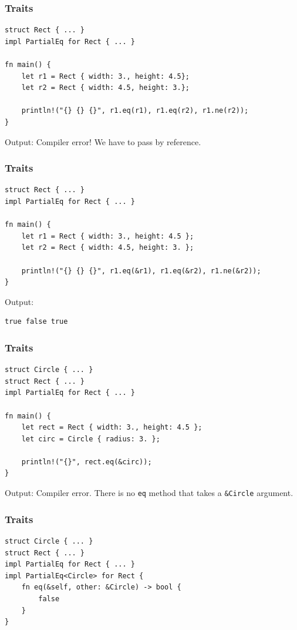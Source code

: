 \begin{frame}[fragile]
    \frametitle{Traits}
    \begin{verbatim}
struct Rect { ... }
impl PartialEq for Rect { ... }

fn main() {
    let r1 = Rect { width: 3., height: 4.5};
    let r2 = Rect { width: 4.5, height: 3.};

    println!("{} {} {}", r1.eq(r1), r1.eq(r2), r1.ne(r2));
}
    \end{verbatim}
    \vfill
    Output:
    \pause
    \vfill
    Compiler error! We have to pass by reference.
\end{frame}

\begin{frame}[fragile]
    \frametitle{Traits}
    \begin{verbatim}
struct Rect { ... }
impl PartialEq for Rect { ... }

fn main() {
    let r1 = Rect { width: 3., height: 4.5 };
    let r2 = Rect { width: 4.5, height: 3. };

    println!("{} {} {}", r1.eq(&r1), r1.eq(&r2), r1.ne(&r2));
}
    \end{verbatim}
    \vfill
    Output:
    \pause
    \vfill
    \begin{verbatim}
true false true
    \end{verbatim}
\end{frame}

\begin{frame}[fragile]
    \frametitle{Traits}
    \begin{verbatim}
struct Circle { ... }
struct Rect { ... }
impl PartialEq for Rect { ... }

fn main() {
    let rect = Rect { width: 3., height: 4.5 };
    let circ = Circle { radius: 3. };

    println!("{}", rect.eq(&circ));
}
    \end{verbatim}
    \vfill
    Output:
    \pause
    \vfill
    Compiler error. There is no \texttt{eq} method that takes a \texttt{\&Circle} argument.
\end{frame}

\begin{frame}[fragile]
    \frametitle{Traits}
    \begin{verbatim}
struct Circle { ... }
struct Rect { ... }
impl PartialEq for Rect { ... }
impl PartialEq<Circle> for Rect {
    fn eq(&self, other: &Circle) -> bool {
        false
    }
}
    \end{verbatim}
\end{frame}

